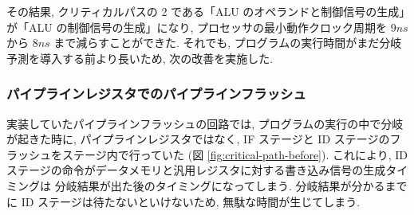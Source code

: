 \documentclass[../improvements.tex]{subfiles}
\begin{document}
  その結果, クリティカルパスの 2 である「ALU のオペランドと制御信号の生成」が「ALU の制御信号の生成」になり, 
  プロセッサの最小動作クロック周期を $9\unit{ns}$ から $8\unit{ns}$ まで減らすことができた.
  それでも, プログラムの実行時間がまだ分岐予測を導入する前より長いため, 次の改善を実施した.

  \subsubsection{パイプラインレジスタでのパイプラインフラッシュ} \label{subsubsection:rethink-flush}
  実装していたパイプラインフラッシュの回路では, 
  プログラムの実行の中で分岐が起きた時に, 
  パイプラインレジスタではなく, IF ステージと ID ステージのフラッシュをステージ内で行っていた (図 \ref{fig:critical-path-before}).
  これにより, ID ステージの命令がデータメモリと汎用レジスタに対する書き込み信号の生成タイミングは
  分岐結果が出た後のタイミングになってしまう.
  分岐結果が分かるまでに ID ステージは待たないといけないため, 無駄な時間が生じてしまう.
\end{document}
